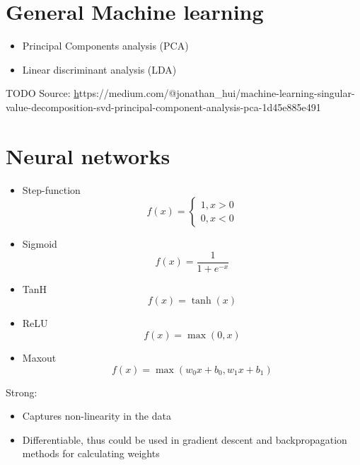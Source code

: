\documentclass{article}
\begin{document}
\section{General Machine learning}
\begin{itemize}
    \item Principal Components analysis (PCA)
    \item Linear discriminant analysis (LDA)
\end{itemize}

TODO
\small Source: \href{https://medium.com/@jonathan_hui/machine-learning-singular-value-decomposition-svd-principal-component-analysis-pca-1d45e885e491}https://medium.com/@jonathan\_hui/machine-learning-singular-value-decomposition-svd-principal-component-analysis-pca-1d45e885e491

\section{Neural networks}


\begin{itemize}
    \item Step-function $$f(x)=\begin{cases} 1, x>0 \\ 0,  x<0 \end{cases}$$
    \item Sigmoid $$f(x)=\frac{1}{1+e^{-x}}$$
    \item TanH $$ f(x)=\tanh(x)$$
    \item ReLU $$f(x)=\max(0,x)$$
    \item Maxout $$f(x) = \max(w_0x + b_0, w_1x + b_1)$$
\end{itemize}


Strong:
\begin{itemize}
    \item Captures non-linearity in the data
    \item Differentiable, thus could be used in gradient descent and backpropagation methods for calculating weights
\end{itemize}
\end{document}
